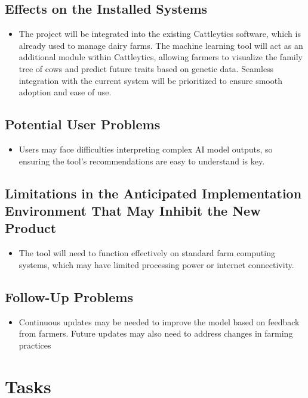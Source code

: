 \documentclass[12pt]{article}
\begin{document}
\subsection{Effects on the Installed Systems}
\begin{itemize}
	\item The project will be integrated into the existing Cattleytics software,
	      which is already used to manage dairy farms. The machine learning tool
	      will act as an additional module within Cattleytics, allowing farmers to
	      visualize the family tree of cows and predict future traits based on
	      genetic data. Seamless integration with the current system will be
	      prioritized to ensure smooth adoption and ease of use.
\end{itemize}
\subsection{Potential User Problems}
\begin{itemize}
	\item Users may face difficulties interpreting complex AI model outputs, so
	      ensuring the tool’s recommendations are easy to understand is key.
\end{itemize}
\subsection{Limitations in the Anticipated Implementation Environment That May
Inhibit the New Product}
\begin{itemize}
	\item The tool will need to function effectively on standard farm computing
	      systems, which may have limited processing power or internet
	      connectivity.
\end{itemize}
\subsection{Follow-Up Problems}
\begin{itemize}
	\item Continuous updates may be needed to improve the model based on feedback
	      from farmers. Future updates may also need to address changes in farming
	      practices
\end{itemize}

\section{Tasks}
\end{document}
